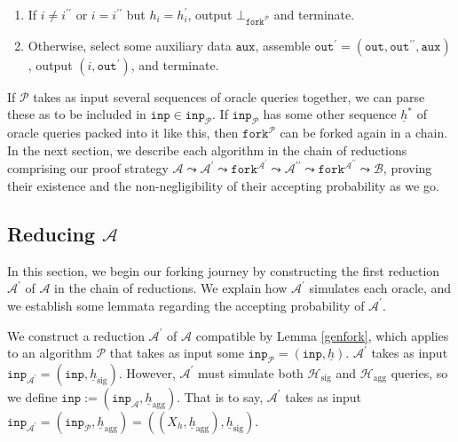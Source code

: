 \documentclass{iacrtrans}
\theoremstyle{definition}
\numberwithin{theorem}{subsection}
\numberwithin{lemma}{theorem}
\newcommand{\adversary}{\mathcal{A}}
\newcommand{\reduxChain}{\adversary \leadsto \adversary^\prime \leadsto \texttt{fork}^{\adversary^\prime}  \leadsto \adversary^{\prime \prime} \leadsto \texttt{fork}^{\adversary^{\prime \prime}} \leadsto \mathcal{B}}
\begin{document}
\begin{description}
\begin{enumerate}
\item If $i \neq i^{\prime \prime}$ or $i = i^{\prime \prime}$ but $h_{i} = h^{\prime}_{i}$, output $\bot_{\texttt{fork}^{\mathcal{P}}}$ and terminate.

\item Otherwise, select some auxiliary data $\texttt{aux}$, assemble $\texttt{out}^\prime = (\texttt{out}, \texttt{out}^{\prime\prime}, \texttt{aux})$, output $(i, \texttt{out}^\prime)$, and terminate. 
\end{enumerate}

\end{description} %
If $\mathcal{P}$ takes as input several sequences of oracle queries together, we can parse these as to be included in $\texttt{inp} \in \texttt{inp}_{\mathcal{P}}$. If $\texttt{inp}_{\mathcal{P}}$ has some other sequence $\underline{h}^*$ of oracle queries packed into it like this,  then $\texttt{fork}^{\mathcal{P}}$ can be forked again in a chain. In the next section, we describe each algorithm in the chain  of reductions comprising our proof strategy $\reduxChain$, proving their existence and the non-negligibility of their accepting probability as we go.

\subsection{Reducing \texorpdfstring{$\adversary$}{the forger}}\label{reducingA}

In this section, we begin our forking journey by constructing the first reduction $\adversary^\prime$ of $\adversary$ in the chain of reductions. We explain how $\adversary^\prime$ simulates each oracle, and we establish some lemmata regarding the accepting probability of $\adversary^\prime$.

We construct a reduction $\adversary^\prime$ of $\adversary$ compatible by Lemma \ref{genfork}, which applies to an algorithm $\mathcal{P}$ that takes as input some $\texttt{inp}_\mathcal{P} = (\texttt{inp}, \underline{h})$.  $\adversary^\prime$ takes as input $\texttt{inp}_{\adversary^\prime} = (\texttt{inp}, \underline{h}_{\text{sig}})$. However, $\adversary^\prime$ must simulate both $\mathcal{H}_{\text{sig}}$ and $\mathcal{H}_{\text{agg}}$ queries, so we define $\texttt{inp} := (\texttt{inp}_{\adversary}, \underline{h}_{\text{agg}})$. That is to say, $\adversary^\prime$ takes as input $\texttt{inp}_{\adversary^\prime} = (\texttt{inp}_\mathcal{P}, \underline{h}_{\text{agg}}) = \left((X_h, \underline{h}_{\text{agg}}), \underline{h}_{\text{sig}}\right)$. 
\end{document}
